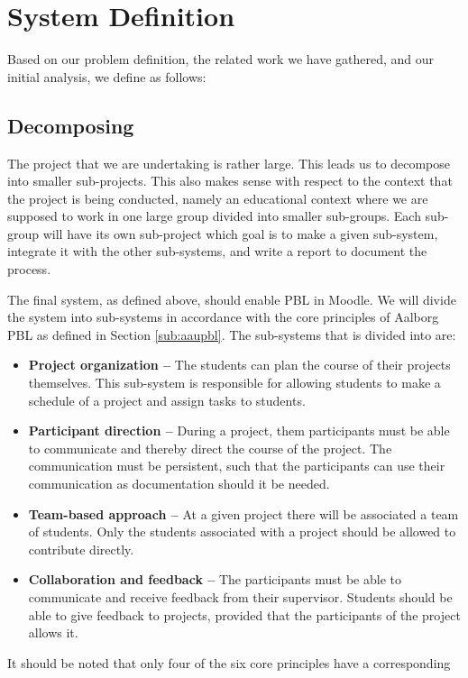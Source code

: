 \section{System Definition}
Based on our problem definition, the related work we have gathered, and our initial analysis, we define \system as follows:












\subsection{Decomposing \system}
\label{sub:decomposingSys}
The project that we are undertaking is rather large.
This leads us to decompose into smaller sub-projects.
This also makes sense with respect to the context that the project is being conducted, namely an educational context where we are supposed to work in one large group divided into smaller sub-groups.
Each sub-group will have its own sub-project which goal is to make a given sub-system, integrate it with the other sub-systems, and write a report to document the process.

The final system, as defined above, should enable PBL in Moodle.
We will divide the system into sub-systems in accordance with the core principles of Aalborg PBL as defined in Section \ref{sub:aaupbl}.
The sub-systems that \system is divided into are:
\begin{itemize}
	\item \textbf{Project organization --} The students can plan the course of their projects themselves.
	This sub-system is responsible for allowing students to make a schedule of a project and assign tasks to students.
	\item \textbf{Participant direction --} During a project, them participants must be able to communicate and thereby direct the course of the project.
	The communication must be persistent, such that the participants can use their communication as documentation should it be needed.
	\item \textbf{Team-based approach --} At a given project there will be associated a team of students.
	Only the students associated with a project should be allowed to contribute directly.
	\item \textbf{Collaboration and feedback --} The participants must be able to communicate and receive feedback from their supervisor.
	Students should be able to give feedback to projects, provided that the participants of the project allows it.
\end{itemize}

It should be noted that only four of the six core principles have a corresponding 










